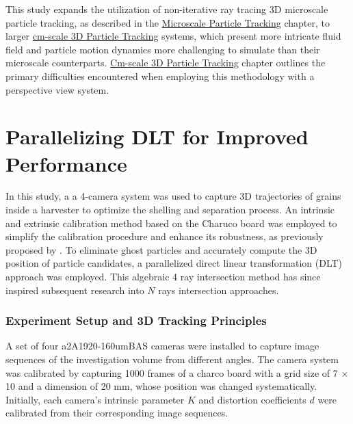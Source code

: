 \documentclass[draftthesis,fullpage]{uiucthesis}
\begin{document}
This study expands the utilization of non-iterative ray tracing 3D microscale particle tracking, as described in the \hyperref[chapter:MPT]{Microscale Particle Tracking} chapter, to larger \hyperref[chapter:cm]{cm-scale 3D Particle Tracking} systems, which present more intricate fluid field and particle motion dynamics more challenging to simulate than their microscale counterparts. \hyperref[chapter:cm-scale]{Cm-scale 3D Particle Tracking} chapter outlines the primary difficulties encountered when employing this methodology with a perspective view system.








\renewcommand{\cleardoublepage}{} %
\renewcommand{\clearpage}{}
\chapter{Parallelizing DLT for Improved Performance}\label{chapter:DLT}
In this study, a a 4-camera system was used to capture 3D trajectories of grains inside a harvester to optimize the shelling and separation process. An intrinsic and extrinsic calibration method based on the Charuco board was employed to simplify the calibration procedure and enhance its robustness, as previously proposed by \cite{an2018charuco}. To eliminate ghost particles and accurately compute the 3D position of particle candidates, a parallelized direct linear transformation (DLT) approach was employed. This algebraic 4 ray intersection method has since inspired subsequent research into $N$ rays intersection approaches.



\subsection*{Experiment Setup and 3D Tracking Principles}

A set of four a2A1920-160umBAS cameras were installed to capture image sequences of the investigation volume from different angles. The camera system was calibrated by capturing 1000 frames of a charco board with a grid size of 7 $\times$ 10 and a dimension of 20 mm, whose position was changed systematically. Initially, each camera's intrinsic parameter $K$ and distortion coefficients $d$ were calibrated from their corresponding image sequences.
\end{document}
